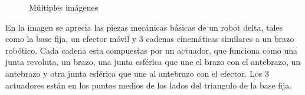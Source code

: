        \begin{figure}[h]
         \centering
         \caption{Múltiples imágenes}
         \label{f:Anexo_B_Metodo_A_Modelacion_Cinematica_Posicion_12}
        \end{figure}
        
        En la imagen se aprecia las piezas mecánicas básicas de un robot delta, tales como la  base fija, un efector móvil y 3 cadenas cinemáticas similares a un brazo robótico. Cada cadena esta compuestas por un actuador, que funciona como una junta revoluta, un brazo, una junta esférica que une el brazo con el antebrazo, un antebrazo y otra junta esférica que une al antebrazo con el efector. Los 3 actuadores están en los puntos medios de los lados del triangulo de la base fija.
        
